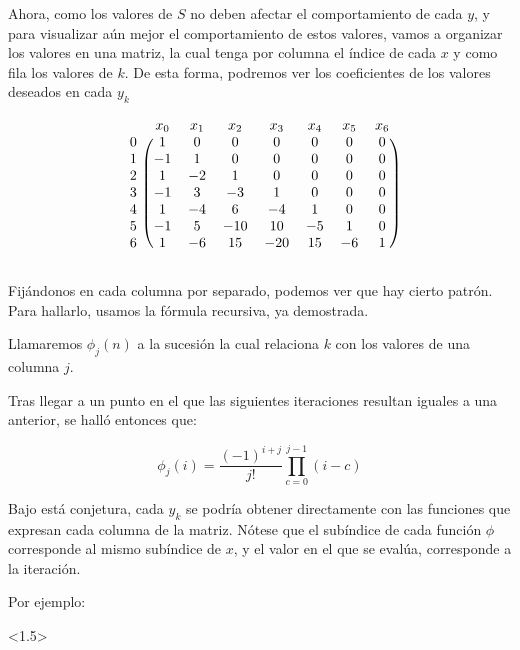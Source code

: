 Ahora, como los valores de $S$ no deben afectar el comportamiento de cada $y$, y para visualizar
aún mejor el comportamiento de estos valores, vamos a organizar los valores en una matriz,
la cual tenga por columna el índice de cada $x$ y como fila los valores de $k$. De esta forma,
podremos ver los coeficientes de los valores deseados en cada $y_k$

\[
\begin{blockarray}{cccccccc}
        & x_0     & x_1   & x_2   & x_3   & x_4   & x_5   & x_6\\
    \begin{block}{c(ccccccc)}
    0   &   1     & 0     & 0     & 0     & 0     & 0     & 0\\
    1   &   -1    & 1     & 0     & 0     & 0     & 0     & 0\\
    2   &   1     & -2    & 1     & 0     & 0     & 0     & 0\\
    3   &   -1    & 3     & -3    & 1     & 0     & 0     & 0\\
    4   &   1     & -4    & 6     & -4    & 1     & 0     & 0\\
    5   &   -1    & 5     & -10   & 10    & -5    & 1     & 0\\
    6   &   1     & -6    & 15    & -20   & 15    & -6    & 1\\
    \end{block}
\end{blockarray}
\]

Fijándonos en cada columna por separado, podemos ver que hay cierto
patrón. Para hallarlo, usamos la fórmula recursiva, ya demostrada.

Llamaremos $\phi_j(n)$ a la sucesión la cual relaciona $k$ con los valores
de una columna $j$.

Tras llegar a un punto en el que las siguientes iteraciones resultan iguales a una
anterior, se halló entonces que:

\[\phi_j(i) = \dfrac{(-1)^{i + j}}{j!}\prod_{c=0}^{j-1}(i - c)\]

Bajo está conjetura, cada $y_k$ se podría obtener directamente con las funciones que
expresan cada columna de la matriz. Nótese que el subíndice de cada función $\phi$
corresponde al mismo subíndice de $x$, y el valor en el que se evalúa, corresponde
a la iteración.

Por ejemplo:

\begin{center}
    \begin{derivation}<1.5>
            \\
        \\
    \end{derivation}
\end{center}

